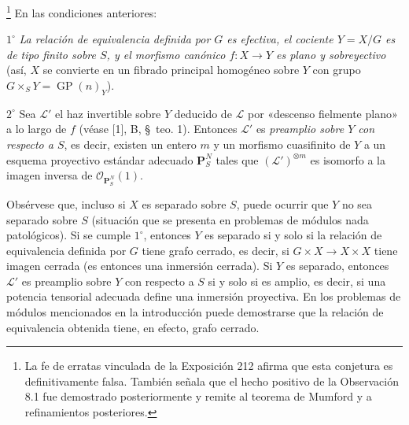 \footnote{La fe de erratas vinculada de la Exposición 212
afirma que esta conjetura es definitivamente falsa. También señala que el
hecho positivo de la Observación 8.1 fue demostrado posteriormente y remite
al teorema de Mumford y a refinamientos posteriores.} En las condiciones
anteriores:

\smallskip
\noindent $1^\circ$ \emph{La relación de equivalencia definida por $G$ es
efectiva, el cociente $Y=X/G$ es de tipo finito sobre $S$, y el morfismo
canónico $f:X\to Y$ es plano y sobreyectivo} (así, $X$ se convierte en un
fibrado principal homogéneo sobre $Y$ con grupo
$G\times_S Y=\operatorname{GP}(n)_Y$).

\smallskip
\noindent $2^\circ$ Sea $\mathcal L'$ el haz invertible sobre $Y$ deducido de
$\mathcal L$ por «descenso fielmente plano» a lo largo de $f$ (véase [1], B,
\S~teo. 1). Entonces $\mathcal L'$ es \emph{preamplio sobre $Y$ con respecto
a $S$}, es decir, existen un entero $m$ y un morfismo cuasifinito de $Y$ a un
esquema proyectivo estándar adecuado $\mathbf P_S^N$ tales que
$(\mathcal L')^{\otimes m}$ es isomorfo a la imagen inversa de
$\mathcal O_{\mathbf P_S^N}(1)$.

Obsérvese que, incluso si $X$ es separado sobre $S$, puede ocurrir que $Y$ no
sea separado sobre $S$ (situación que se presenta en problemas de módulos
nada patológicos). Si se cumple $1^\circ$, entonces $Y$ es separado si y solo
si la relación de equivalencia definida por $G$ tiene grafo cerrado, es decir,
si $G\times X\to X\times X$ tiene imagen cerrada (es entonces una inmersión
cerrada). Si $Y$ es separado, entonces $\mathcal L'$ es preamplio sobre $Y$
con respecto a $S$ si y solo si es amplio, es decir, si una potencia tensorial
adecuada define una inmersión proyectiva. En los problemas de módulos
mencionados en la introducción puede demostrarse que la relación de
equivalencia obtenida tiene, en efecto, grafo cerrado.

